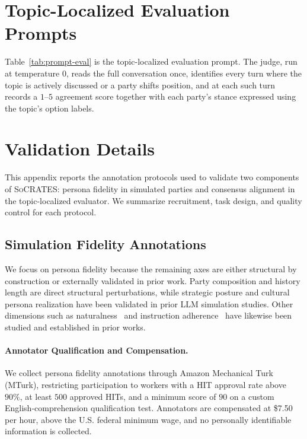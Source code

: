 \documentclass{llmxive}
\providecommand{\algname}{\textsc{SoCRATES}}
\begin{document}
\section{Topic-Localized Evaluation Prompts}
\label{app:evaluator_detail}
Table~\ref{tab:prompt-eval} is the topic-localized evaluation prompt. The judge, run at temperature $0$, reads the full conversation once, identifies every turn where the topic is actively discussed or a party shifts position, and at each such turn records a $1$--$5$ agreement score together with each party's stance expressed using the topic's option labels.




\section{Validation Details}
\label{app:validation_detail}

This appendix reports the annotation protocols used to validate two components of \algname{}: persona fidelity in simulated parties and consensus alignment in the topic-localized evaluator. We summarize recruitment, task design, and quality control for each protocol.

\subsection{Simulation Fidelity Annotations}
\label{app:simulation_validation_detail}
We focus on persona fidelity because the remaining axes are either structural by construction or externally validated in prior work. Party composition and history length are direct structural perturbations, while strategic posture \citep{chen2026simulating, liu2025promediate} and cultural persona realization \citep{dey2025can} have been validated in prior LLM simulation studies. Other dimensions such as naturalness~\citep{liu2025promediate} and instruction adherence~\citep{vaccaro2025advancing} have likewise been studied and established in prior works.



\paragraph{Annotator Qualification and Compensation.}
We collect persona fidelity annotations through Amazon Mechanical Turk (MTurk), restricting participation to workers with a HIT approval rate above $90\%$, at least $500$ approved HITs, and a minimum score of $90$ on a custom English-comprehension qualification test. Annotators are compensated at \$7.50 per hour, above the U.S. federal minimum wage, and no personally identifiable information is collected.
\end{document}
